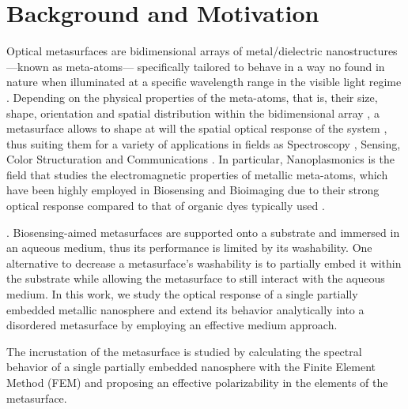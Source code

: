 
\chapter*{Background and Motivation}
\label{chapter:intro}



Optical metasurfaces are bidimensional arrays of metal/dielectric nanostructures ---known as meta-atoms--- specifically tailored to behave in a way no found in nature when illuminated at a specific wavelength range in the visible light regime \cite{khan_optical_2022,gonzalez-alcalde_large_2020}. Depending on the physical properties of the meta-atoms, that is, their size, shape, orientation and spatial distribution within the bidimensional array \cite{kim_plasmonic_2019,khan_optical_2022}, a metasurface  allows to shape at will the  spatial optical response of the system \cite{chen_review_2016}, thus suiting them for a variety of applications in fields as Spectroscopy \cite{khan_optical_2022}, Sensing\cite{estevez_trends_2014,jain_noble_2008,khan_optical_2022,chen_review_2016,kim_plasmonic_2019}, Color Structuration \cite{gonzalez-alcalde_large_2020} and Communications \cite{chen_review_2016}. In particular, Nanoplasmonics is the field  that studies the electromagnetic properties of metallic meta-atoms, which have been highly employed in Biosensing and Bioimaging due to their strong optical response compared to that of organic dyes typically used \cite{kim_plasmonic_2019}.




. Biosensing-aimed metasurfaces are supported onto a substrate and immersed in an aqueous medium, thus its performance is limited by its washability. One alternative to decrease a metasurface's washability is to partially embed it within the substrate while allowing the metasurface to still interact with the aqueous medium. In this work, we study the optical response of a single partially embedded metallic nanosphere  and extend its behavior analytically into a disordered metasurface by employing an effective medium approach.

The incrustation of the metasurface is studied by calculating the spectral behavior of a single partially embedded nanosphere with the Finite Element Method (FEM) and proposing an effective polarizability  in the elements of the metasurface.

